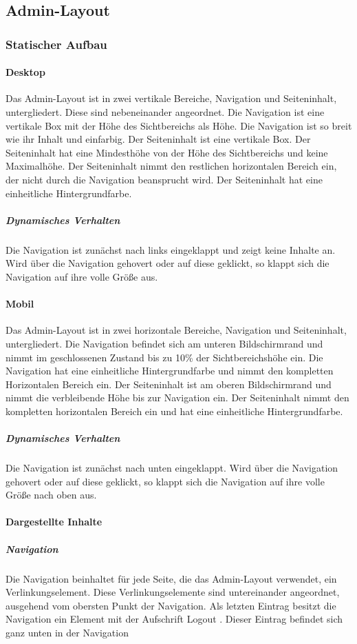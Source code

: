 \subsection{Admin-Layout}

\subsubsection{Statischer Aufbau}
\paragraph*{Desktop}
Das Admin-Layout ist in zwei vertikale Bereiche, Navigation und Seiteninhalt, untergliedert. Diese sind nebeneinander angeordnet.
Die Navigation ist eine vertikale Box mit der Höhe des Sichtbereichs als Höhe.
Die Navigation ist so breit wie ihr Inhalt und einfarbig.
Der Seiteninhalt ist eine vertikale Box. Der Seiteninhalt hat eine Mindesthöhe von der Höhe des Sichtbereichs und keine Maximalhöhe.
Der Seiteninhalt nimmt den restlichen horizontalen Bereich ein, der nicht durch die Navigation beansprucht wird.
Der Seiteninhalt hat eine einheitliche Hintergrundfarbe.

\subparagraph*{Dynamisches Verhalten}
Die Navigation ist zunächst nach links eingeklappt und zeigt keine Inhalte an. Wird über die Navigation gehovert oder auf diese geklickt,
so klappt sich die Navigation auf ihre volle Größe aus. 

\paragraph*{Mobil}
Das Admin-Layout ist in zwei horizontale Bereiche, Navigation und Seiteninhalt, untergliedert.
Die Navigation befindet sich am unteren Bildschirmrand und nimmt im geschlossenen Zustand bis zu 10\% der Sichtbereichshöhe ein.
Die Navigation hat eine einheitliche Hintergrundfarbe und nimmt den kompletten Horizontalen Bereich ein.
Der Seiteninhalt ist am oberen Bildschirmrand und nimmt die verbleibende Höhe bis zur Navigation ein.
Der Seiteninhalt nimmt den kompletten horizontalen Bereich ein und hat eine einheitliche Hintergrundfarbe.

\subparagraph*{Dynamisches Verhalten}
Die Navigation ist zunächst nach unten eingeklappt. Wird über die Navigation gehovert oder auf diese geklickt,
so klappt sich die Navigation auf ihre volle Größe nach oben aus.

\paragraph*{Dargestellte Inhalte}
\subparagraph*{Navigation}
Die Navigation beinhaltet für jede Seite, die das Admin-Layout verwendet, ein Verlinkungselement. 
Diese Verlinkungselemente sind untereinander angeordnet, ausgehend vom obersten Punkt der Navigation.
Als letzten Eintrag besitzt die Navigation ein Element mit der Aufschrift \dq Logout \dq. Dieser Eintrag befindet sich ganz unten in der Navigation

